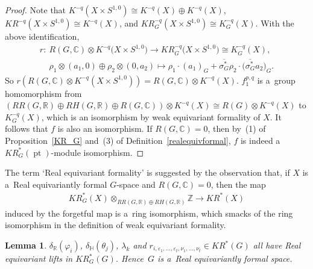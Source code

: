 \documentclass[pdftex]{sigma}
\numberwithin{equation}{section}
\newtheorem{Lemma}[Theorem]{Lemma}
\DeclareMathOperator{\pt}{pt}
\begin{document}
\begin{proof}
Note that $K^{-q}(X\times S^{1, 0})\cong K^{-q}(X)\oplus K^{-q}(X)$, $KR^{-q}(X\times S^{1, 0})\cong K^{-q}(X)$, and
$KR_G^{-q}(X\times S^{1, 0})\cong K_G^{-q}(X)$.
With the above identif\/ication,
\begin{gather*}
r: \ R(G, \mathbb{C})\otimes K^{-q}\big(X\times S^{1, 0}\big)  \to  KR_G^{-q}\big(X\times S^{1, 0}\big)\cong K_G^{-q}(X),
\\
\phantom{r: {}} \
\rho_1\otimes(a_1, 0)\oplus \rho_2\otimes (0, a_2)  \mapsto  \rho_1\cdot (a_1)_G+\overline{\sigma_G^*}
\rho_2\cdot \big(\overline{\sigma_G^*}a_2\big)_G.
\end{gather*}
So $r(R(G, \mathbb{C})\otimes K^{-q}(X\times S^{1, 0}))= R(G, \mathbb{C})\otimes K^{-q}(X)$.
$f_1^{p, q}$ is a~group homomorphism from $(RR(G, \mathbb{R})\oplus RH(G, \mathbb{R})\oplus R(G, \mathbb{C}))\otimes
K^{-q}(X)\cong R(G)\otimes K^{-q}(X)$ to $K_G^{-q}(X)$, which is an isomorphism by weak equivariant formality of $X$.
It follows that $f$ is also an isomorphism.
If $R(G, \mathbb{C})=0$, then by~(1) of Proposition~\ref{KR_G} and~(3) of Def\/inition~\ref{realequivformal}, $f$ is
indeed a~$KR_G^*(\pt)$-module isomorphism.
\end{proof}
\begin{Remark}
The term `Real equivariant formality' is suggested by the observation that, if $X$ is a~Real equivariantly formal
$G$-space and $R(G, \mathbb{C})=0$, then the map
\begin{gather*}
KR^*_G(X)\otimes_{RR(G, \mathbb{R})\oplus RH(G, \mathbb{R})}\mathbb{Z}\to KR^*(X)
\end{gather*}
induced by the forgetful map is a~ring isomorphism, which smacks of the ring isomorphism in the def\/inition of weak
equivariant formality.
\end{Remark}
\begin{Lemma}
\label{realequivlift}
$\delta_\mathbb{R}(\varphi_i)$, $\delta_\mathbb{H}(\theta_j)$, $\lambda_k$ and $r_{i, \varepsilon_1, \dots,
\varepsilon_t, \nu_1, \dots, \nu_t}\in KR^*(G)$ all have Real equivariant lifts in $KR_G^*(G)$.
Hence~$G$ is a~Real equivariantly formal space.
\end{Lemma}
\end{document}
